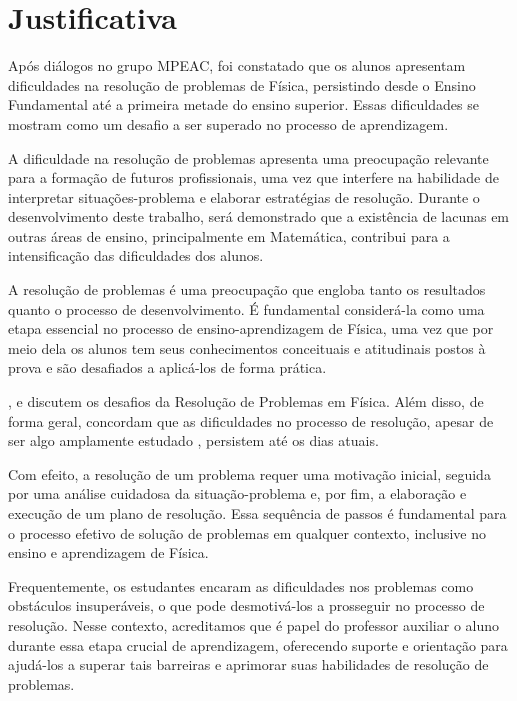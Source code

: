 \section{Justificativa}

 Após diálogos no grupo MPEAC, foi constatado que os alunos apresentam dificuldades na resolução de problemas de Física, persistindo desde o Ensino Fundamental até a primeira metade do ensino superior. Essas dificuldades se mostram como um desafio a ser superado no processo de aprendizagem.
 
A dificuldade na resolução de problemas apresenta uma preocupação relevante para a formação de futuros profissionais, uma vez que interfere na habilidade de interpretar situações-problema e elaborar estratégias de resolução. Durante o desenvolvimento deste trabalho, será demonstrado que a existência de lacunas em outras áreas de ensino, principalmente em Matemática, contribui para a intensificação das dificuldades dos alunos. 

A resolução de problemas é uma preocupação que engloba tanto os resultados quanto o processo de desenvolvimento. É fundamental considerá-la como uma etapa essencial no processo de ensino-aprendizagem de Física, uma vez que por meio dela os alunos tem seus conhecimentos conceituais e atitudinais postos à prova e são desafiados a aplicá-los de forma prática.

,  e  discutem os desafios da Resolução de Problemas em Física. Além disso, de forma geral, concordam que as dificuldades no processo de resolução, apesar de ser algo amplamente estudado \cite{oliveira2017}, persistem até os dias atuais.


Com efeito, a resolução de um problema requer uma motivação inicial, seguida por uma análise cuidadosa da situação-problema e, por fim, a elaboração e execução de um plano de resolução. Essa sequência de passos é fundamental para o processo efetivo de solução de problemas em qualquer contexto, inclusive no ensino e aprendizagem de Física.

Frequentemente, os estudantes encaram as dificuldades nos problemas como obstáculos insuperáveis, o que pode desmotivá-los a prosseguir no processo de resolução. Nesse contexto, acreditamos que é papel do professor auxiliar o aluno durante essa etapa crucial de aprendizagem, oferecendo suporte e orientação para ajudá-los a superar tais barreiras e aprimorar suas habilidades de resolução de problemas.

